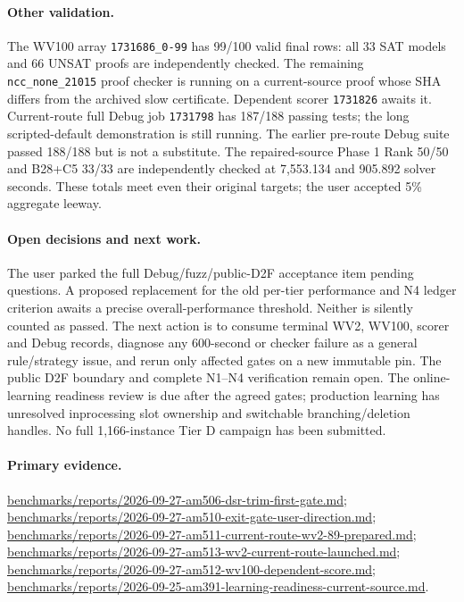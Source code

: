 \documentclass[11pt]{article}
\begin{document}
\paragraph{Other validation.}
The WV100 array \texttt{1731686\_0-99} has 99/100 valid final rows: all 33 SAT
models and 66 UNSAT proofs are independently checked. The remaining
\texttt{ncc\_none\_21015} proof checker is running on a current-source proof
whose SHA differs from the archived slow certificate. Dependent scorer
\texttt{1731826} awaits it. Current-route full Debug job \texttt{1731798}
has 187/188 passing tests; the long scripted-default demonstration is still
running. The earlier pre-route Debug suite passed 188/188 but is not a
substitute. The repaired-source Phase 1 Rank 50/50 and B28+C5 33/33 are
independently checked at 7,553.134 and 905.892 solver seconds. These totals
meet even their original targets; the user accepted 5\% aggregate leeway.

\paragraph{Open decisions and next work.}
The user parked the full Debug/fuzz/public-D2F acceptance item pending
questions. A proposed replacement for the old per-tier performance and N4
ledger criterion awaits a precise overall-performance threshold. Neither is
silently counted as passed. The next action is to consume terminal WV2,
WV100, scorer and Debug records, diagnose any 600-second or checker failure
as a general rule/strategy issue, and rerun only affected gates on a new
immutable pin. The public D2F boundary and complete N1--N4 verification
remain open. The online-learning readiness review is due after the agreed
gates; production learning has unresolved inprocessing slot ownership and
switchable branching/deletion handles. No full 1,166-instance Tier D campaign
has been submitted.

\paragraph{Primary evidence.}
\url{benchmarks/reports/2026-09-27-am506-dsr-trim-first-gate.md};
\url{benchmarks/reports/2026-09-27-am510-exit-gate-user-direction.md};
\url{benchmarks/reports/2026-09-27-am511-current-route-wv2-89-prepared.md};
\url{benchmarks/reports/2026-09-27-am513-wv2-current-route-launched.md};
\url{benchmarks/reports/2026-09-27-am512-wv100-dependent-score.md};
\url{benchmarks/reports/2026-09-25-am391-learning-readiness-current-source.md}.
\end{document}

